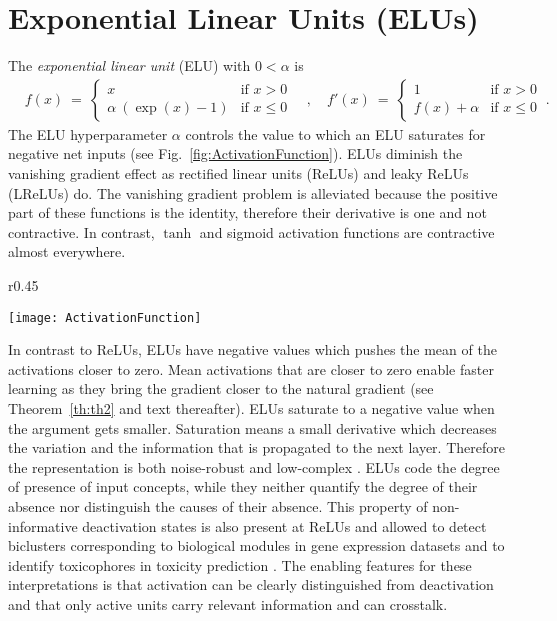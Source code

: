 \documentclass{article}
\begin{document}
\section{Exponential Linear Units (ELUs)}
\label{sec:elu}



The {\em exponential linear unit} (ELU) with $0<\alpha$ is
\begin{align}
\label{eq:elu}
&f(x) \ = \
\begin{cases}
x &\mbox{if } x > 0 \\
\alpha \ (\exp(x)-1) & \mbox{if } x \leq 0
\end{cases} \quad ,  \quad
f'(x) \ = \
\begin{cases}
1 &\mbox{if } x > 0 \\
f(x) + \alpha & \mbox{if } x \leq 0
\end{cases} \ .
\end{align}
The ELU hyperparameter $\alpha$ controls the value to
which an ELU saturates for negative net inputs (see Fig.~\ref{fig:ActivationFunction}).
ELUs diminish the vanishing gradient effect
as rectified linear units (ReLUs) and leaky ReLUs
(LReLUs) do.
The vanishing gradient problem is alleviated because
the positive part of these functions is the identity,
therefore their derivative is one and not contractive.
In contrast, $\tanh$ and sigmoid activation functions are contractive
almost everywhere.

\begin{wrapfigure}{r}{0.45\textwidth}
\vspace*{-10pt}
\begin{center}
\texttt{[image: ActivationFunction]}
\end{center}
\caption{The rectified linear unit (ReLU), the leaky ReLU (LReLU, $\alpha=0.1$), the shifted ReLUs (SReLUs),
and the exponential linear unit (ELU, $\alpha=1.0$). \label{fig:ActivationFunction}}
\vspace*{-5pt}
\end{wrapfigure}
In contrast to ReLUs, ELUs have negative values which
pushes the mean of the activations closer to zero.
Mean activations that are closer to zero enable faster learning as
they bring the gradient closer to the natural gradient (see
Theorem~\ref{th:th2} and text thereafter).
ELUs saturate to a negative value when the argument gets smaller.
Saturation means a small derivative
which decreases the variation and the information that is
propagated to the next layer. Therefore the representation
is both noise-robust and low-complex \citep{Hochreiter:99nc}.
ELUs code the degree of presence of input concepts,
while they neither quantify the degree of their absence nor distinguish
the causes of their absence.
This property of non-informative deactivation states is also present at ReLUs
and allowed to detect biclusters corresponding to
biological modules in gene expression datasets \citep{Clevert:15nips} and
to identify toxicophores in toxicity prediction \citep{Unterthiner:15,Mayr:15}.
The enabling features for these interpretations
is that activation can be clearly distinguished from deactivation
and that only active units carry relevant information and can crosstalk.
\end{document}
